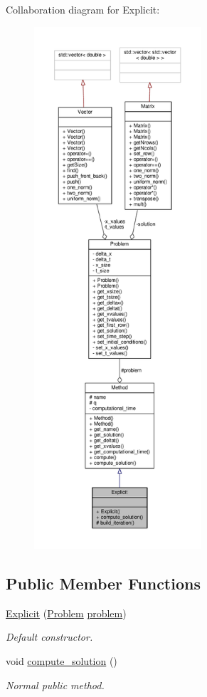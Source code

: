 Collaboration diagram for Explicit\+:
\nopagebreak
\begin{figure}[H]
\begin{center}
\leavevmode
\includegraphics[height=550pt]{classExplicit__coll__graph}
\end{center}
\end{figure}
\subsection*{Public Member Functions}
\begin{DoxyCompactItemize}
\item 
\hyperlink{classExplicit_a87a81a730d68689268204ae8b296075d}{Explicit} (\hyperlink{classProblem}{Problem} \hyperlink{classMethod_a29a08a679b5d30a8c813766308205041}{problem})
\begin{DoxyCompactList}\small\item\em Default constructor. \end{DoxyCompactList}\item 
void \hyperlink{classExplicit_a09fa3df66e16200fefaabc908e6efafd}{compute\+\_\+solution} ()
\begin{DoxyCompactList}\small\item\em Normal public method. \end{DoxyCompactList}\end{DoxyCompactItemize}
